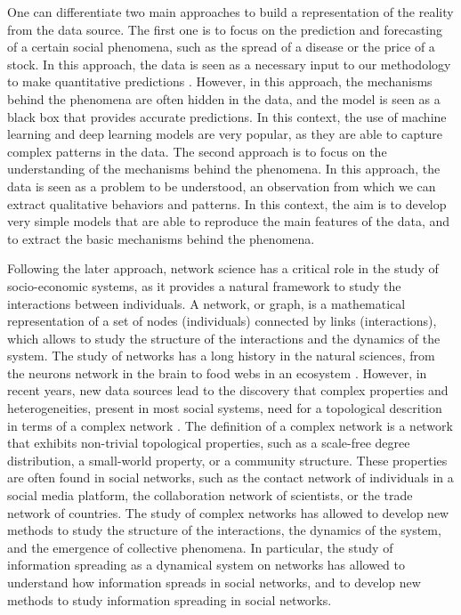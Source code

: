 One can differentiate two main approaches to build a representation of the reality from the data source. The first one is to focus on the prediction and forecasting of a certain social phenomena, such as the spread of a disease or the price of a stock. In this approach, the data is seen as a necessary input to our methodology to make quantitative predictions \cite{}. However, in this approach, the mechanisms behind the phenomena are often hidden in the data, and the model is seen as a black box that provides accurate predictions. In this context, the use of machine learning \cite{} and deep learning \cite{} models are  very popular, as they are able to capture complex patterns in the data. The second approach is to focus on the understanding of the mechanisms behind the phenomena. In this approach, the data is seen as a problem to be understood, an observation from which we can extract qualitative behaviors and patterns. In this context, the aim is to develop very simple models that are able to reproduce the main features of the data, and to extract the basic mechanisms behind the phenomena.

Following the later approach, network science has a critical role in the study of socio-economic systems, as it provides a natural framework to study the interactions between individuals. A network, or graph, is a mathematical representation of a set of nodes (individuals) connected by links (interactions), which allows to study the structure of the interactions and the dynamics of the system. The study of networks has a long history in the natural sciences, from the neurons network in the brain \cite{} to food webs in an ecosystem \cite{}. However, in recent years, new data sources lead to the discovery that complex properties and heterogeneities, present in most social systems, need for a topological descrition in terms of a complex network \cite{}. The definition of a complex network is a network that exhibits non-trivial topological properties, such as a scale-free degree distribution, a small-world property, or a community structure. These properties are often found in social networks, such as the contact network of individuals in a social media platform, the collaboration network of scientists, or the trade network of countries. The study of complex networks has allowed to develop new methods to study the structure of the interactions, the dynamics of the system, and the emergence of collective phenomena. In particular, the study of information spreading as a dynamical system on networks has allowed to understand how information spreads in social networks, and to develop new methods to study information spreading in social networks.


